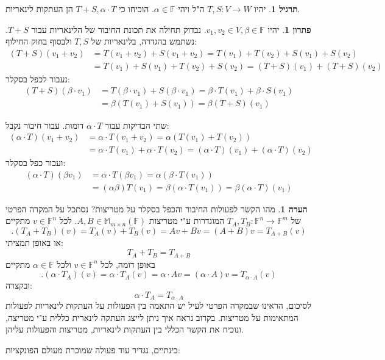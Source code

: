 \documentclass[12pt]{report}
\theoremstyle{plain}
\theoremstyle{definition}
\newtheorem{exercise}{תרגיל}[chapter]
\newtheorem{remark}{הערה}[chapter]
\newtheorem*{solution}{פתרון}
\newcommand{\F}{\mathbb{F}}
\newcommand{\M}{\mathbb{M}}
\newcommand{\0}{\mathbf{0}}
\begin{document}
\begin{exercise}
יהיו
$T,S:V\to W$
ה"ל ויהי
$\alpha\in\F$.
הוכיחו כי
$T+S,\alpha\cdot T$
הן העתקות לינאריות.
\end{exercise}

\begin{solution}
יהיו 
$v_1,v_2\in V, \beta\in \F$.
נבדוק תחילה את תכונת החיבור של הלינאריות עבור 
$T+S$.
נשתמש בהגדרה, בלינאריות של 
$T,S$
ולבסוף בחוק החילוף:
$$
\begin{aligned}
(T+S)(v_1+v_2)&=T(v_1+v_2)+S(v_1+v_2)=T(v_1)+T(v_2)+S(v_1)+S(v_2) \\
&=T(v_1)+S(v_1)+T(v_2)+S(v_2)=(T+S)(v_1)+(T+S)(v_2)
\end{aligned}
$$
נעבור לכפל בסקלר:
$$
\begin{aligned}
(T+S)(\beta\cdot v_1)&=T(\beta\cdot v_1)+S(\beta\cdot v_1)=\beta\cdot T(v_1)+\beta\cdot S(v_1)\\
&=\beta(T(v_1)+S(v_1))=\beta (T+S)(v_1)
\end{aligned}
$$

שתי הבדיקות עבור 
$\alpha\cdot T$
דומות. עבור חיבור נקבל:
$$
\begin{aligned}
(\alpha\cdot T)(v_1+v_2)&=\alpha\cdot T(v_1+v_2)=\alpha(T(v_1)+T(v_2)) \\
&=\alpha\cdot T(v_1)+\alpha\cdot T(v_2)=(\alpha\cdot T)(v_1)+(\alpha\cdot T)(v_2)
\end{aligned}
$$
ועבור כפל בסקלר:
$$
\begin{aligned}
(\alpha\cdot T)(\beta v_1)&=\alpha\cdot T(\beta v_1)=\alpha(\beta\cdot T(v_1)) \\
&=(\alpha\beta)T(v_1)=\beta(\alpha\cdot T(v_1))=\beta(\alpha\cdot T)(v_1)
\end{aligned}
$$

\end{solution}

\begin{remark}
מהו הקשר לפעולות החיבור והכפל בסקלר על מטריצות? נסתכל על המקרה הפרטי של
$T_A,T_B:\F^n\to\F^m$
המוגדרות ע"י מטריצות
$A,B\in\M_{m\times n}(\F)$.
לכל
$v\in\F^n$
מתקיים
$$
.(T_A+T_B)(v)=T_A(v)+T_B(v)=Av+Bv=(A+B)v=T_{A+B}(v)
$$
או באופן תמציתי:
$$
T_A+T_B=T_{A+B}
$$
באופן דומה, לכל
$v\in\F^n$
ולכל
$\alpha\in \F$
מתקיים
$$
.(\alpha\cdot T_A)(v)=\alpha\cdot T_A(v)=\alpha\cdot Av=(\alpha\cdot A)v=T_{\alpha\cdot A}(v)
$$
ובקצרה:
$$
\alpha\cdot T_A=T_{\alpha\cdot A}
$$
לסיכום, הראינו שבמקרה הפרטי לעיל יש התאמה בין הפעולות על העתקות לינאריות לפעולות המתאימות על מטריצות. בקרוב נראה איך ניתן לייצג העתקה לינארית כללית ע"י מטריצה, ונוכיח את הקשר הכללי בין העתקות לינאריות, מטריצות והפעולות עליהן.
\end{remark}
בינתיים, נגדיר עוד פעולה שמוכרת מעולם הפונקציות:
\end{document}
